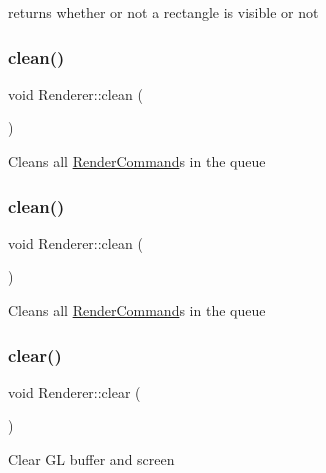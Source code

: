 returns whether or not a rectangle is visible or not \mbox{\label{classRenderer_a609184e9e7ed6bf88448458ffc229981}} 
\subsubsection{\texorpdfstring{clean()}{clean()}\hspace{0.1cm}{\footnotesize\ttfamily [1/2]}}
{\footnotesize\ttfamily void Renderer\+::clean (\begin{DoxyParamCaption}{ }\end{DoxyParamCaption})}

Cleans all {\ttfamily \hyperlink{classRenderCommand}{Render\+Command}}s in the queue \mbox{\label{classRenderer_a609184e9e7ed6bf88448458ffc229981}} 
\subsubsection{\texorpdfstring{clean()}{clean()}\hspace{0.1cm}{\footnotesize\ttfamily [2/2]}}
{\footnotesize\ttfamily void Renderer\+::clean (\begin{DoxyParamCaption}{ }\end{DoxyParamCaption})}

Cleans all {\ttfamily \hyperlink{classRenderCommand}{Render\+Command}}s in the queue \mbox{\label{classRenderer_ac46720b3fc0dbb2fc37674766490a8c4}} 
\subsubsection{\texorpdfstring{clear()}{clear()}\hspace{0.1cm}{\footnotesize\ttfamily [1/2]}}
{\footnotesize\ttfamily void Renderer\+::clear (\begin{DoxyParamCaption}{ }\end{DoxyParamCaption})}

Clear GL buffer and screen \mbox{\label{classRenderer_ac46720b3fc0dbb2fc37674766490a8c4}} 
